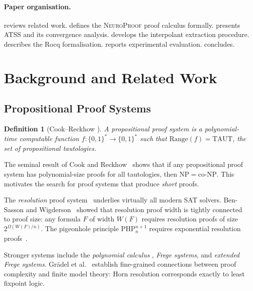 \documentclass[conference]{IEEEtran}
\newtheorem{definition}[theorem]{Definition}
\newcommand{\NP}{\textsc{NeuroProof}}
\newcommand{\ATSS}{\textsc{ATSS}}
\newcommand{\PHP}{\mathrm{PHP}}
\begin{document}
\paragraph{Paper organisation.}
 reviews related work.   defines the
\NP{} proof calculus formally.   presents \ATSS{} and its
convergence analysis.   develops the interpolant
extraction procedure.   describes the Rocq formalisation.
 reports experimental evaluation.  
concludes.

\section{Background and Related Work}
\label{sec:background}

\subsection{Propositional Proof Systems}

\begin{definition}[Cook--Reckhow \cite{CookReckhow1979}]
A \emph{propositional proof system} is a polynomial-time computable function
$f : \{0,1\}^* \to \{0,1\}^*$ such that $\mathrm{Range}(f) = \mathrm{TAUT}$,
the set of propositional tautologies.
\end{definition}

The seminal result of Cook and Reckhow~\cite{CookReckhow1979} shows that
if any propositional proof system has polynomial-size proofs for all
tautologies, then $\mathrm{NP} = \mathrm{co\text{-}NP}$.  This motivates
the search for proof systems that produce \emph{short} proofs.

The \emph{resolution} proof system~\cite{Robinson1965} underlies virtually all
modern SAT solvers.  Ben-Sasson and Wigderson~\cite{Ben-Sasson2001} showed that
resolution proof width is tightly connected to proof size: any formula $F$ of
width $W(F)$ requires resolution proofs of size $2^{\Omega(W(F)/n)}$.  The
pigeonhole principle $\PHP_{n}^{n+1}$ requires exponential resolution
proofs~\cite{Pitassi1998}.

Stronger systems include the \emph{polynomial calculus}
\cite{Tzameret2011,AtseriasOchremiak2019}, \emph{Frege systems}, and
\emph{extended Frege systems}.  Grädel et al.~\cite{GradelGrohe2019} establish
fine-grained connections between proof complexity and finite model theory:
Horn resolution corresponds exactly to least fixpoint logic.
\end{document}

